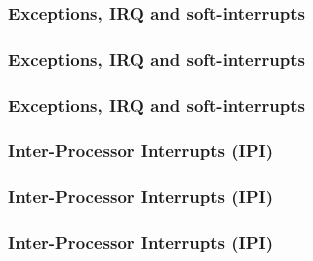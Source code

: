 
\begin{frame}
  \frametitle{Exceptions, IRQ and soft-interrupts}

  \begin{center}
  \end{center}

\end{frame}


\begin{frame}
  \frametitle{Exceptions, IRQ and soft-interrupts}

  \begin{center}
  \end{center}

\end{frame}


\begin{frame}
  \frametitle{Exceptions, IRQ and soft-interrupts}

  \begin{center}
  \end{center}

\end{frame}


\begin{frame}
  \frametitle{Inter-Processor Interrupts (IPI)}

  \begin{center}
  \end{center}

\end{frame}


\begin{frame}
  \frametitle{Inter-Processor Interrupts (IPI)}

  \begin{center}
  \end{center}

\end{frame}


\begin{frame}
  \frametitle{Inter-Processor Interrupts (IPI)}

  \begin{center}
  \end{center}

\end{frame}

